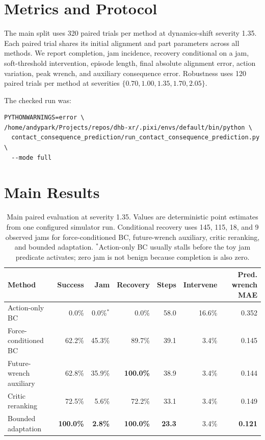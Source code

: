 \documentclass[11pt]{article}
\begin{document}
\section{Metrics and Protocol}
The main split uses 320 paired trials per method at dynamics-shift severity 1.35. Each paired trial shares its initial alignment and part parameters across all methods. We report completion, jam incidence, recovery conditional on a jam, soft-threshold intervention, episode length, final absolute alignment error, action variation, peak wrench, and auxiliary consequence error. Robustness uses 120 paired trials per method at severities $\{0.70,1.00,1.35,1.70,2.05\}$.

The checked run was:
\begin{verbatim}
PYTHONWARNINGS=error \
/home/andypark/Projects/repos/dhb-xr/.pixi/envs/default/bin/python \
  contact_consequence_prediction/run_contact_consequence_prediction.py \
  --mode full
\end{verbatim}

\section{Main Results}
\begin{table}[H]
\centering
\small
\begin{tabular}{lrrrrrr}
\toprule
Method & Success & Jam & Recovery & Steps & Intervene & Pred. wrench MAE \\
\midrule
Action-only BC & 0.0\% & 0.0\%$^*$ & 0.0\% & 58.0 & 16.6\% & 0.352 \\
Force-conditioned BC & 62.2\% & 45.3\% & 89.7\% & 39.1 & 3.4\% & 0.145 \\
Future-wrench auxiliary & 62.8\% & 35.9\% & \textbf{100.0\%} & 38.9 & 3.4\% & 0.144 \\
Critic reranking & 72.5\% & 5.6\% & 72.2\% & 33.1 & 3.4\% & 0.149 \\
Bounded adaptation & \textbf{100.0\%} & \textbf{2.8\%} & \textbf{100.0\%} & \textbf{23.3} & 3.4\% & \textbf{0.121} \\
\bottomrule
\end{tabular}
\caption{Main paired evaluation at severity 1.35. Values are deterministic point estimates from one configured simulator run. Conditional recovery uses 145, 115, 18, and 9 observed jams for force-conditioned BC, future-wrench auxiliary, critic reranking, and bounded adaptation. $^*$Action-only BC usually stalls before the toy jam predicate activates; zero jam is not benign because completion is also zero.}
\label{tab:main}
\end{table}
\end{document}
